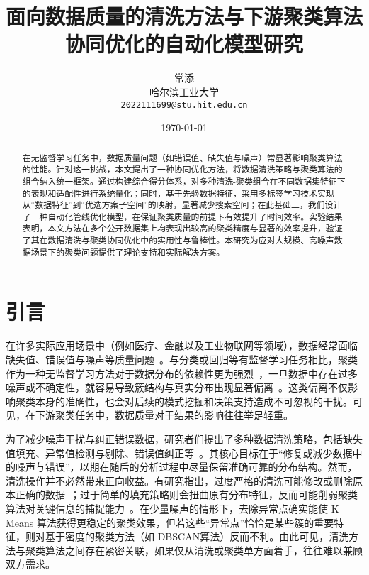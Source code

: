 \documentclass[8pt]{article} %
\numberwithin{equation}{section}
\begin{document}
\title{\textbf{面向数据质量的清洗方法与下游聚类算法协同优化的自动化模型研究}}
\author{常添 \\哈尔滨工业大学 \\ \texttt{2022111699@stu.hit.edu.cn}}
\date{\today}
\maketitle
\begin{abstract}
\normalsize
在无监督学习任务中，数据质量问题（如错误值、缺失值与噪声）常显著影响聚类算法的性能。针对这一挑战，本文提出了一种协同优化方法，将数据清洗策略与聚类算法的组合纳入统一框架。通过构建综合得分体系，对多种清洗-聚类组合在不同数据集特征下的表现和适配性进行系统量化；同时，基于先验数据特征，采用多标签学习技术实现从“数据特征”到“优选方案子空间”的映射，显著减少搜索空间；在此基础上，我们设计了一种自动化管线优化模型，在保证聚类质量的前提下有效提升了时间效率。实验结果表明，本文方法在多个公开数据集上均表现出较高的聚类精度与显著的效率提升，验证了其在数据清洗与聚类协同优化中的实用性与鲁棒性。本研究为应对大规模、高噪声数据场景下的聚类问题提供了理论支持和实际解决方案。
\end{abstract}

\section{引言}

在许多实际应用场景中（例如医疗、金融以及工业物联网等领域），数据经常面临缺失值、错误值与噪声等质量问题~\cite{ref1, ref2}。与分类或回归等有监督学习任务相比，聚类作为一种无监督学习方法对于数据分布的依赖性更为强烈~\cite{ref3}，一旦数据中存在过多噪声或不确定性，就容易导致簇结构与真实分布出现显著偏离~\cite{ref4}。这类偏离不仅影响聚类本身的准确性，也会对后续的模式挖掘和决策支持造成不可忽视的干扰。可见，在下游聚类任务中，数据质量对于结果的影响往往举足轻重。

为了减少噪声干扰与纠正错误数据，研究者们提出了多种数据清洗策略，包括缺失值填充、异常值检测与剔除、错误值纠正等~\cite{ref5}。其核心目标在于“修复或减少数据中的噪声与错误”，以期在随后的分析过程中尽量保留准确可靠的分布结构。然而，清洗操作并不必然带来正向收益。有研究指出，过度严格的清洗可能修改或删除原本正确的数据~\cite{ref6}；过于简单的填充策略则会扭曲原有分布特征，反而可能削弱聚类算法对关键信息的捕捉能力~\cite{ref7}。在少量噪声的情形下，去除异常点确实能使 K-Means 算法获得更稳定的聚类效果，但若这些“异常点”恰恰是某些簇的重要特征，则对基于密度的聚类方法（如 DBSCAN算法）反而不利。由此可见，清洗方法与聚类算法之间存在紧密关联，如果仅从清洗或聚类单方面着手，往往难以兼顾双方需求。
\end{document}
